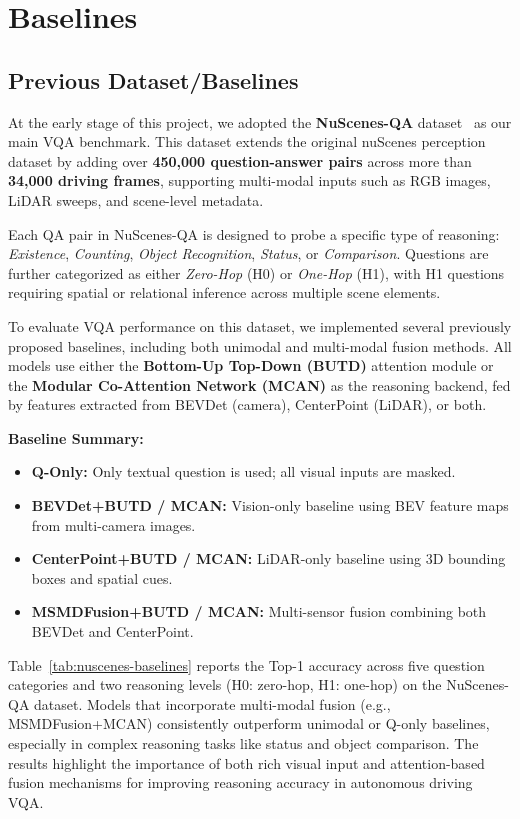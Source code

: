 \documentclass{article} %
\begin{document}
\clearpage
\section{ Baselines}
\subsection{Previous Dataset/Baselines}

At the early stage of this project, we adopted the \textbf{NuScenes-QA} dataset~\cite{qian2024nuscenes} as our main VQA benchmark. This dataset extends the original nuScenes perception dataset by adding over \textbf{450,000 question-answer pairs} across more than \textbf{34,000 driving frames}, supporting multi-modal inputs such as RGB images, LiDAR sweeps, and scene-level metadata.

Each QA pair in NuScenes-QA is designed to probe a specific type of reasoning: \textit{Existence}, \textit{Counting}, \textit{Object Recognition}, \textit{Status}, or \textit{Comparison}. Questions are further categorized as either \textit{Zero-Hop} (H0) or \textit{One-Hop} (H1), with H1 questions requiring spatial or relational inference across multiple scene elements.

To evaluate VQA performance on this dataset, we implemented several previously proposed baselines, including both unimodal and multi-modal fusion methods. All models use either the \textbf{Bottom-Up Top-Down (BUTD)} attention module or the \textbf{Modular Co-Attention Network (MCAN)} as the reasoning backend, fed by features extracted from BEVDet (camera), CenterPoint (LiDAR), or both.

\vspace{0.5em}
\textbf{Baseline Summary:}
\begin{itemize}
    \item \textbf{Q-Only:} Only textual question is used; all visual inputs are masked.
    \item \textbf{BEVDet+BUTD / MCAN:} Vision-only baseline using BEV feature maps from multi-camera images.
    \item \textbf{CenterPoint+BUTD / MCAN:} LiDAR-only baseline using 3D bounding boxes and spatial cues.
    \item \textbf{MSMDFusion+BUTD / MCAN:} Multi-sensor fusion combining both BEVDet and CenterPoint.
\end{itemize}

Table~\ref{tab:nuscenes-baselines} reports the Top-1 accuracy across five question categories and two reasoning levels (H0: zero-hop, H1: one-hop) on the NuScenes-QA dataset. Models that incorporate multi-modal fusion (e.g., MSMDFusion+MCAN) consistently outperform unimodal or Q-only baselines, especially in complex reasoning tasks like status and object comparison. The results highlight the importance of both rich visual input and attention-based fusion mechanisms for improving reasoning accuracy in autonomous driving VQA.
\end{document}
